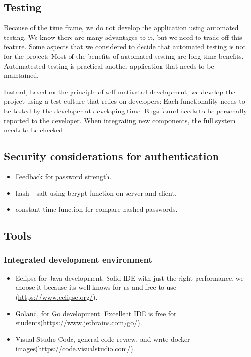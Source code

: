 \subsection{ Testing}
\indent
\indent
Because of the time frame, we do not develop the application using automated testing. We know there are many advantages to it, but we need to trade off this feature. Some aspects that we considered to decide that automated testing is not for the project:
Most of the benefits of automated testing are long time benefits.
Automatested testing is practical another application that needs to be maintained.

Instead, based on the principle of self-motivated development, we develop the project using a test culture that relies on developers:
Each functionality needs to be tested by the developer at developing time.
Bugs found needs to be personally reported to the developer.
When integrating new components, the full system needs to be checked. 

\subsection{Security considerations for authentication}
\begin{itemize}

	\item  Feedback for password strength.
	\item  hash+ salt using bcrypt function on server and client.
	\item constant time function for compare hashed passwords.
\end{itemize}
\subsection{Tools}



\subsubsection{Integrated development environment}

\begin{itemize}

	\item  Eclipse for Java development. Solid IDE with just the right performance, we choose it because its well knows for us and free to use (\url{https://www.eclipse.org/}).
	\item  Goland, for Go development. Excellent IDE is free for students(\url{https://www.jetbrains.com/go/}). 
	\item  Visual Studio Code, general code review, and write docker images(\url{https://code.visualstudio.com/}).

\end{itemize}
